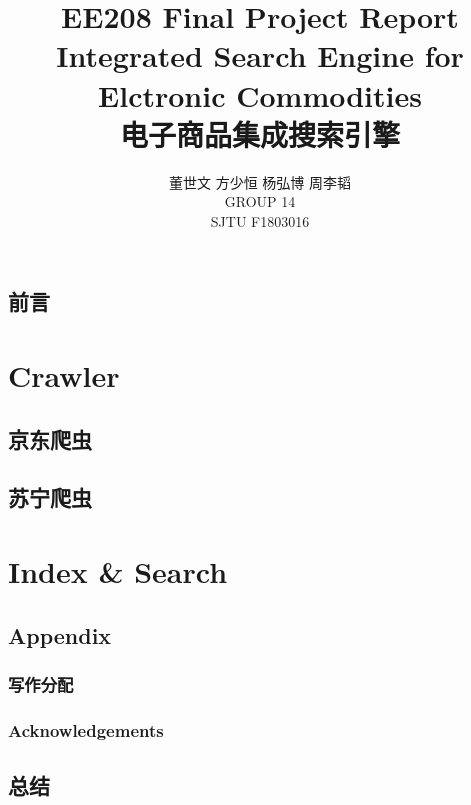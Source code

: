 \documentclass{book}
\begin{document}
\title{EE208 Final Project Report \\ Integrated Search Engine for Elctronic Commodities \\ 电子商品集成搜索引擎}

\author{董世文 \quad 方少恒 \quad  杨弘博 \quad  周李韬 \\ GROUP 14 \\ SJTU F1803016} %

\maketitle 

\tableofcontents 

\mainmatter %


\frontmatter

\chapter{前言}


\mainmatter


\part{Crawler}

\chapter{京东爬虫}





\chapter{苏宁爬虫}








\part{Index \& Search}



\backmatter

\chapter{Appendix}

\section*{写作分配}

\section*{Acknowledgements}

\chapter{总结}
\end{document}
